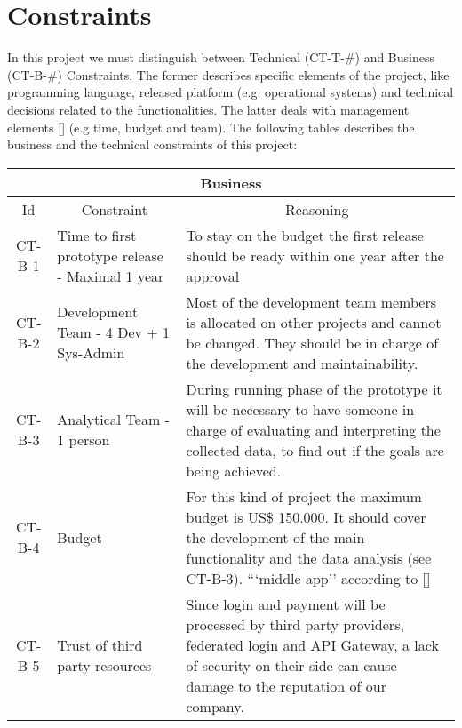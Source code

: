 \section{Constraints}

In this project we must distinguish between Technical (CT-T-\#) and Business (CT-B-\#) Constraints. The former 
describes specific elements of the project, like programming language, released platform (e.g. operational
systems) and technical decisions related to the functionalities. The latter deals with management elements [\cite{refonline:EFAD}] (e.g time, budget and team). The following tables describes the business and the technical constraints of this project: 

\begin{table}[H]
    \begin{tabularx}{\textwidth}{|c|X|X|}
        \hline
        \multicolumn{3}{c}{\textbf{Business}} \\
        \hline
        \toprule
        \multicolumn{1}{c}{Id} & \multicolumn{1}{c}{Constraint} & \multicolumn{1}{c}{Reasoning} \\
        \midrule
        CT-B-1 & Time to first prototype release - Maximal 1 year & To stay on the budget the first release should
        be ready within one year after the approval \\
        CT-B-2 & Development Team - 4 Dev + 1 Sys-Admin & Most of the development team members is allocated on
        other projects and cannot be changed. They should be in charge of the development and maintainability. \\
        CT-B-3 & Analytical Team - 1 person & During running phase of the prototype it will be necessary to have someone 
        in charge of evaluating and interpreting the collected data, to find out if the goals are being achieved. \\
        CT-B-4 & Budget & For this kind of project the maximum budget is US\$ 150.000. It should cover the development of 
        the main functionality and the data analysis (see CT-B-3).  ```middle app'' according to [\cite{refonline:SPDLOAD}] \\
        CT-B-5 & Trust of third party resources & Since login and payment will be processed by third party providers,
        \gls{federated login} and \gls{API Gateway}, a lack of security on their side can cause damage to the reputation of 
        our company. \\
        \bottomrule
    \end{tabularx}
\end{table}



